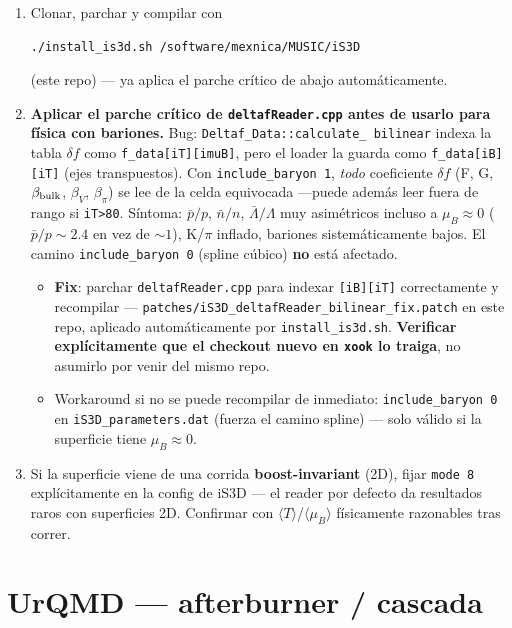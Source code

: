 \documentclass[11pt]{article}
\begin{document}
\begin{enumerate}[leftmargin=*]
  \item Clonar, parchar y compilar con
\begin{Verbatim}[fontsize=\small]
./install_is3d.sh /software/mexnica/MUSIC/iS3D
\end{Verbatim}
  (este repo) --- ya aplica el parche crítico de abajo automáticamente.
  \item \textbf{Aplicar el parche crítico de \texttt{deltafReader.cpp} antes
  de usarlo para física con bariones.} Bug: \texttt{Deltaf\_Data::calculate\_
  bilinear} indexa la tabla $\delta f$ como \texttt{f\_data[iT][imuB]}, pero
  el loader la guarda como \texttt{f\_data[iB][iT]} (ejes transpuestos). Con
  \texttt{include\_baryon 1}, \emph{todo} coeficiente $\delta f$ (F, G,
  $\beta_{\rm bulk}$, $\beta_V$, $\beta_\pi$) se lee de la celda equivocada
  ---puede además leer fuera de rango si \texttt{iT>80}. Síntoma:
  $\bar p/p$, $\bar n/n$, $\bar\Lambda/\Lambda$ muy asimétricos incluso a
  $\mu_B\approx0$ ($\bar p/p\sim2.4$ en vez de $\sim1$), K/$\pi$ inflado,
  bariones sistemáticamente bajos. El camino \texttt{include\_baryon 0}
  (spline cúbico) \textbf{no} está afectado.
  \begin{itemize}
    \item \textbf{Fix}: parchar \texttt{deltafReader.cpp} para indexar
    \texttt{[iB][iT]} correctamente y recompilar ---
    \texttt{patches/iS3D\_deltafReader\_bilinear\_fix.patch} en este repo,
    aplicado automáticamente por \texttt{install\_is3d.sh}. \textbf{Verificar
    explícitamente que el checkout nuevo en \texttt{xook} lo traiga}, no
    asumirlo por venir del mismo repo.
    \item Workaround si no se puede recompilar de inmediato:
    \texttt{include\_baryon 0} en \texttt{iS3D\_parameters.dat} (fuerza el
    camino spline) --- solo válido si la superficie tiene $\mu_B\approx0$.
  \end{itemize}
  \item Si la superficie viene de una corrida \textbf{boost-invariant}
  (2D), fijar \texttt{mode 8} explícitamente en la config de iS3D --- el
  reader por defecto da resultados raros con superficies 2D. Confirmar con
  $\langle T\rangle$/$\langle\mu_B\rangle$ físicamente razonables tras
  correr.
\end{enumerate}

\section{UrQMD --- afterburner / cascada}
\end{document}
